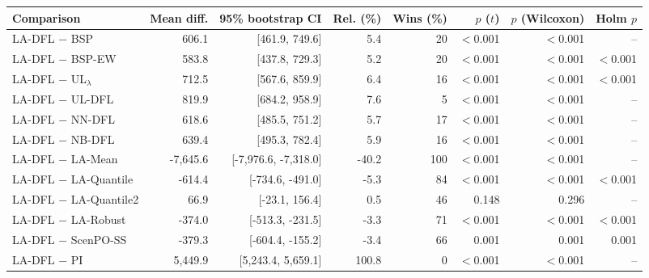 \begin{tabular}{lrrrrrrr}
\toprule
Comparison & Mean diff. & 95\% bootstrap CI & Rel. (\%) & Wins (\%) & $p$ ($t$) & $p$ (Wilcoxon) & Holm $p$ \\
\midrule
LA-DFL $-$ BSP & 606.1 & [461.9, 749.6] & 5.4 & 20 & $<$0.001 & $<$0.001 & -- \\
LA-DFL $-$ BSP-EW & 583.8 & [437.8, 729.3] & 5.2 & 20 & $<$0.001 & $<$0.001 & $<$0.001 \\
LA-DFL $-$ UL$_\lambda$ & 712.5 & [567.6, 859.9] & 6.4 & 16 & $<$0.001 & $<$0.001 & $<$0.001 \\
LA-DFL $-$ UL-DFL & 819.9 & [684.2, 958.9] & 7.6 & 5 & $<$0.001 & $<$0.001 & -- \\
LA-DFL $-$ NN-DFL & 618.6 & [485.5, 751.2] & 5.7 & 17 & $<$0.001 & $<$0.001 & -- \\
LA-DFL $-$ NB-DFL & 639.4 & [495.3, 782.4] & 5.9 & 16 & $<$0.001 & $<$0.001 & -- \\
LA-DFL $-$ LA-Mean & -7,645.6 & [-7,976.6, -7,318.0] & -40.2 & 100 & $<$0.001 & $<$0.001 & -- \\
LA-DFL $-$ LA-Quantile & -614.4 & [-734.6, -491.0] & -5.3 & 84 & $<$0.001 & $<$0.001 & $<$0.001 \\
LA-DFL $-$ LA-Quantile2 & 66.9 & [-23.1, 156.4] & 0.5 & 46 & 0.148 & 0.296 & -- \\
LA-DFL $-$ LA-Robust & -374.0 & [-513.3, -231.5] & -3.3 & 71 & $<$0.001 & $<$0.001 & $<$0.001 \\
LA-DFL $-$ ScenPO-SS & -379.3 & [-604.4, -155.2] & -3.4 & 66 & 0.001 & 0.001 & 0.001 \\
LA-DFL $-$ PI & 5,449.9 & [5,243.4, 5,659.1] & 100.8 & 0 & $<$0.001 & $<$0.001 & -- \\
\bottomrule
\end{tabular}
